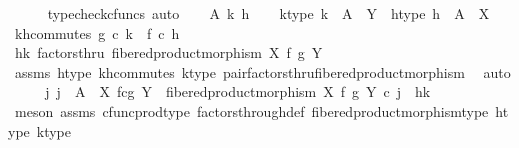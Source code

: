 \begin{isabellebody}
\ \ \ \ \isamarkupfalse%
\ {\isacharparenleft}{\kern0pt}typecheck{\isacharunderscore}{\kern0pt}cfuncs{\isacharcomma}{\kern0pt}\ auto{\isacharparenright}{\kern0pt}\isanewline
{}\isamarkupfalse%
\isanewline
\ \ \isamarkupfalse%
\ A\ k\ h\isanewline
\ \ \isamarkupfalse%
\ k{\isacharunderscore}{\kern0pt}type{\isacharcolon}{\kern0pt}\ {\isachardoublequoteopen}k\ {\isacharcolon}{\kern0pt}\ A\ {\isasymrightarrow}\ Y{\isachardoublequoteclose}\ \ h{\isacharunderscore}{\kern0pt}type{\isacharcolon}{\kern0pt}\ {\isachardoublequoteopen}h\ {\isacharcolon}{\kern0pt}\ A\ {\isasymrightarrow}\ X{\isachardoublequoteclose}\isanewline
\ \ \isamarkupfalse%
\ k{\isacharunderscore}{\kern0pt}h{\isacharunderscore}{\kern0pt}commutes{\isacharcolon}{\kern0pt}\ {\isachardoublequoteopen}g\ {\isasymcirc}\isactrlsub c\ k\ {\isacharequal}{\kern0pt}\ f\ {\isasymcirc}\isactrlsub c\ h{\isachardoublequoteclose}\isanewline
\isanewline
\ \ \isamarkupfalse%
\ {\isachardoublequoteopen}{\isasymlangle}h{\isacharcomma}{\kern0pt}k{\isasymrangle}\ factorsthru\ fibered{\isacharunderscore}{\kern0pt}product{\isacharunderscore}{\kern0pt}morphism\ X\ f\ g\ Y{\isachardoublequoteclose}\isanewline
\ \ \ \ \isamarkupfalse%
\ assms\ h{\isacharunderscore}{\kern0pt}type\ k{\isacharunderscore}{\kern0pt}h{\isacharunderscore}{\kern0pt}commutes\ k{\isacharunderscore}{\kern0pt}type\ pair{\isacharunderscore}{\kern0pt}factorsthru{\isacharunderscore}{\kern0pt}fibered{\isacharunderscore}{\kern0pt}product{\isacharunderscore}{\kern0pt}morphism\ \isamarkupfalse%
\ auto\isanewline
\ \ \isamarkupfalse%
\ \isamarkupfalse%
\ {\isachardoublequoteopen}{\isasymexists}j{\isachardot}{\kern0pt}\ j\ {\isacharcolon}{\kern0pt}\ A\ {\isasymrightarrow}\ X\ \isactrlbsub f\isactrlesub {\isasymtimes}\isactrlsub c\isactrlbsub g\isactrlesub \ Y\ {\isasymand}\ fibered{\isacharunderscore}{\kern0pt}product{\isacharunderscore}{\kern0pt}morphism\ X\ f\ g\ Y\ {\isasymcirc}\isactrlsub c\ j\ {\isacharequal}{\kern0pt}\ {\isasymlangle}h{\isacharcomma}{\kern0pt}k{\isasymrangle}{\isachardoublequoteclose}\isanewline
\ \ \ \ \isamarkupfalse%
\ {\isacharparenleft}{\kern0pt}meson\ assms\ cfunc{\isacharunderscore}{\kern0pt}prod{\isacharunderscore}{\kern0pt}type\ factors{\isacharunderscore}{\kern0pt}through{\isacharunderscore}{\kern0pt}def{}\ fibered{\isacharunderscore}{\kern0pt}product{\isacharunderscore}{\kern0pt}morphism{\isacharunderscore}{\kern0pt}type\ h{\isacharunderscore}{\kern0pt}type\ k{\isacharunderscore}{\kern0pt}type{\isacharparenright}{\kern0pt}\isanewline

\end{isabellebody}
